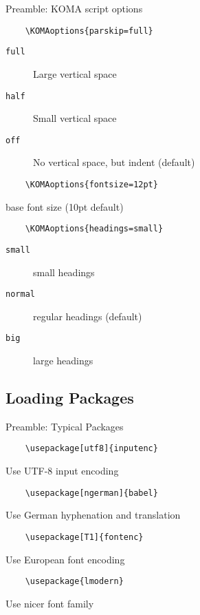 \begin{frame}[fragile]{Preamble: KOMA script options}

  \begin{lstlisting}
    \KOMAoptions{parskip=full}
  \end{lstlisting}
  \begin{description}
    \item[\texttt{full}] Large vertical space
    \item[\texttt{half}] Small vertical space
    \item[\texttt{off}] No vertical space, but indent (default)
  \end{description}

  \begin{lstlisting}
    \KOMAoptions{fontsize=12pt}
  \end{lstlisting}
  base font size (10pt default)

  \begin{lstlisting}
    \KOMAoptions{headings=small}
  \end{lstlisting}
  \begin{description}
    \item[\texttt{small}] small headings
    \item[\texttt{normal}] regular headings (default)
    \item[\texttt{big}] large headings
  \end{description}
\end{frame}

\subsection{Loading Packages}

\begin{frame}[fragile]{Preamble: Typical Packages}
  
  \begin{lstlisting}
    \usepackage[utf8]{inputenc}
  \end{lstlisting}
  Use UTF-8 input encoding
  
  \begin{lstlisting}
    \usepackage[ngerman]{babel}
  \end{lstlisting}
  Use German hyphenation and translation
  
  \begin{lstlisting}
    \usepackage[T1]{fontenc}
  \end{lstlisting}
  Use European font encoding
  
  \begin{lstlisting}
    \usepackage{lmodern}
  \end{lstlisting}
  Use nicer font family
\end{frame}

